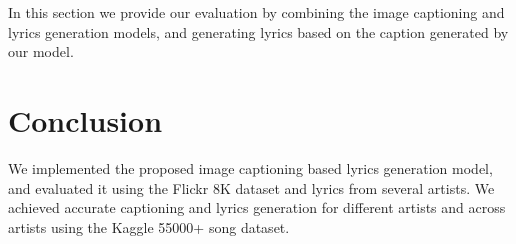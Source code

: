 \documentclass{article}
\begin{document}
In this section we provide our evaluation by combining the image captioning and lyrics generation models, and generating lyrics based on the caption generated by our model. 

\section{Conclusion}
\label{sec:5}

We implemented the proposed image captioning based lyrics generation model, and evaluated it using the Flickr 8K dataset and lyrics from several artists. We achieved accurate captioning and lyrics generation for different artists and across artists using the Kaggle 55000+ song dataset.
\end{document}
